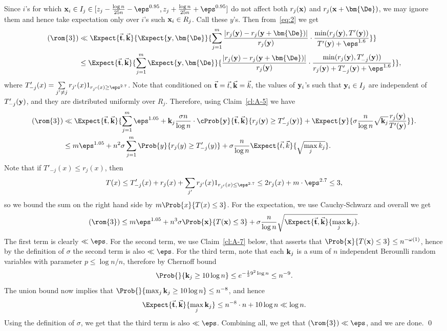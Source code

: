 Since $i$'s for which ${\bf x}_i\in I_j\in [z_j-\frac{\log n}{25 n}-\eps^{0.95},z_j+\frac{\log n}{25n}+\eps^{0.95}]$
do not affect both $r_j({\bf x})$ and $r_j({\bf x}+\bm{\De})$, we may ignore them and hence take expectation only over $i$'s such
${\bf x}_i\in R_j$. Call these $y$'s. Then from~\eqref{eq:2} we get
\begin{align*}
(\rom{3})
&\ll
\Expect{\vec{{\bf t}},\vec{{\bf k}}}
{
\Expect{{\bf y},\bm{\De}}
{
\sum\limits_{j=1}^{m} \frac{|r_j({\bf y}) - r_j({\bf y}+\bm{\De})|}{r_j({\bf y})} \cdot \frac{\min(r_j({\bf y}), T'({\bf y}))}{T'({\bf y})+\eps^{1.6}}
}}\\
&\leq
\Expect{\vec{{\bf t}},\vec{{\bf k}}}
{
\sum\limits_{j=1}^{m}
\Expect{{\bf y},\bm{\De}}
{\frac{|r_j({\bf y}) - r_j({\bf y}+\bm{\De})|}{r_j({\bf y})} \cdot \frac{\min(r_j({\bf y}), T'_{-j}({\bf y}))}{r_j({\bf y})+T'_{-j}({\bf y})+\eps^{1.6}}
}},
\end{align*}
where $T'_{-j}(x) = \sum\limits_{j'\neq j}r_{j'}(x) 1_{r_{j'}(x)\geq \eps^{2.7}}$.
Note that conditioned on $\vec{{\bf t}}= \vec{t},\vec{{\bf k}} = \vec{k}$, the values of ${\bf y}_i$'s such that ${\bf y}_i\in I_j$ are independent of $T'_{-j}({\bf y})$,
and they are distributed uniformly over $R_j$. Therefore, using Claim~\ref{cl:A-5} we have
\begin{align*}
(\rom{3})
&\ll
\Expect{\vec{{\bf t}},\vec{{\bf k}}}{
\sum\limits_{j=1}^{m}
\eps^{1.05}+ {\bf k}_j\frac{\sigma n}{\log n}  \cdot \cProb{{\bf y}}{\vec{{\bf t}},\vec{{\bf k}}}{r_j({\bf y})\ge T'_{-j}({\bf y})}
+\Expect{{\bf y}}{\sigma \frac{n}{\log n}\sqrt{{\bf k}_j}\frac{r_j({\bf y}) }{T'({\bf y})}}
}.\\
&\leq
m\eps^{1.05}
+ n^2\sigma
\sum\limits_{j=1}^{m}\Prob{y}{r_j(y)\ge T'_{-j}(y)}
+ \sigma\frac{n}{\log n}
\Expect{\vec{t},\vec{k}}{\sqrt{\max_{j} k_j}}.
\end{align*}
Note that if $T'_{-j}(x)\leq r_j(x)$, then
\[
T(x) \leq
T'_{-j}(x) + r_j(x) + \sum\limits_{j'}{r_{j'}(x) 1_{r_{j'}(x)\leq \eps^{2.7}}}
\leq 2r_j(x) + m\cdot \eps^{2.7}
\leq 3,
\]
so we bound the sum on the right hand side by $m\Prob{x}{T(x)\leq 3}$. For the expectation,
we use Cauchy-Schwarz and overall we get
\[
(\rom{3})
\leq m\eps^{1.05} + n^3\sigma \Prob{{\bf x}}{T({\bf x})\leq 3} +
\sigma\frac{n}{\log n}\sqrt{\Expect{\vec{{\bf t}},\vec{{\bf k}}}{\max_{j} {{\bf k}_j}}}.
\]
The first term is clearly $\ll \eps$. For the second term, we use Claim~\ref{cl:A-7} below, that asserts that
$\Prob{{\bf x}}{T({\bf x})\leq 3}\leq n^{-\omega(1)}$, hence by the definition of $\sigma$ the second term is
also $\ll \eps$. For the third term, note that each ${\bf k}_j$ is a sum of $n$ independent Berounlli random variables
with parameter $p\leq\log n/n$, therefore by Chernoff bound
\[
\Prob{}{{\bf k}_j\geq 10\log n}
\leq e^{-\frac{1}{3}9^2 \log n}
\leq n^{-9}.
\]
The union bound now implies that $\Prob{}{\max_j {\bf k}_j\geq 10\log n}\leq n^{-8}$, and hence
\[
\Expect{\vec{{\bf t}},\vec{{\bf k}}}{\max_{j} {\bf k}_j}
\leq n^{-8}\cdot n + 10\log n\ll \log n.
\]
Using the definition of $\sigma$, we get that the third term is also $\ll \eps$. Combining all,
we get that $(\rom{3})\ll \eps$, and we are done.
\qed


